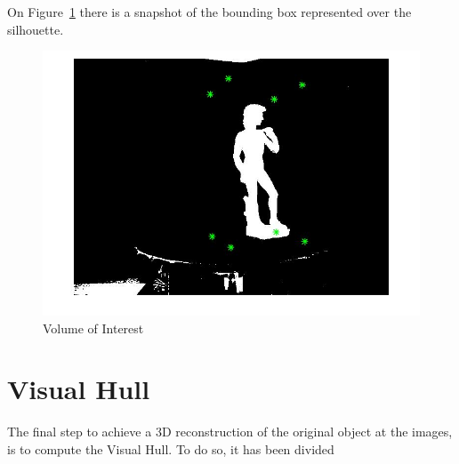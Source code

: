 \documentclass{ethz_report}
\begin{document}
On Figure~\ref{fig:volume_of_interest} there is a snapshot of the bounding box represented over the silhouette.

\begin{figure}[H]
    \centering
    \includegraphics[width=.5\linewidth]{images/volume_of_interest}
    \caption{Volume of Interest}
    \label{fig:volume_of_interest}
\end{figure}

\section*{Visual Hull}

The final step to achieve a 3D reconstruction of the original object at the images, is to compute the Visual Hull. To do so, it has been divided 




\end{document}
